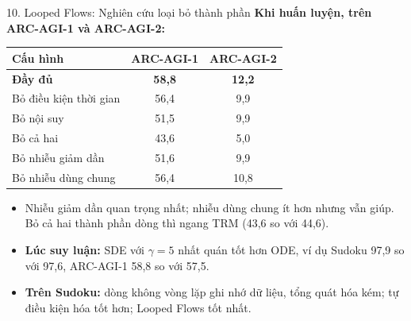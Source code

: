 \begin{frame}{10. Looped Flows: Nghiên cứu loại bỏ thành phần}
    \textbf{Khi huấn luyện, trên ARC-AGI-1 và ARC-AGI-2:}
    \begin{center}
        \small
        \begin{tabular}{lcc}
            \toprule
            \textbf{Cấu hình} & \textbf{ARC-AGI-1} & \textbf{ARC-AGI-2} \\
            \midrule
            \textbf{Đầy đủ} & \textbf{58,8} & \textbf{12,2} \\
            Bỏ điều kiện thời gian & 56,4 & 9,9 \\
            Bỏ nội suy & 51,5 & 9,9 \\
            Bỏ cả hai & 43,6 & 5,0 \\
            Bỏ nhiễu giảm dần & 51,6 & 9,9 \\
            Bỏ nhiễu dùng chung & 56,4 & 10,8 \\
            \bottomrule
        \end{tabular}
    \end{center}
    \begin{small}
    \begin{itemize}
        \item Nhiễu giảm dần quan trọng nhất; nhiễu dùng chung ít hơn nhưng vẫn giúp. Bỏ cả hai thành phần dòng thì ngang TRM (43,6 so với 44,6).
        \item \textbf{Lúc suy luận:} SDE với $\gamma = 5$ nhất quán tốt hơn ODE, ví dụ Sudoku 97,9 so với 97,6, ARC-AGI-1 58,8 so với 57,5.
        \item \textbf{Trên Sudoku:} dòng không vòng lặp ghi nhớ dữ liệu, tổng quát hóa kém; tự điều kiện hóa tốt hơn; Looped Flows tốt nhất.
    \end{itemize}
    \end{small}
\end{frame}


